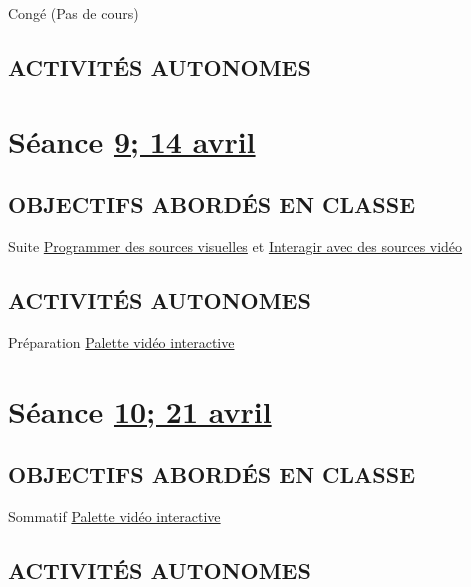 \documentclass[
  french,
]{book}
\begin{document}
Congé (Pas de cours)

\hypertarget{activituxe9s-autonomes-9}{%
\subsection{ACTIVITÉS AUTONOMES}\label{activituxe9s-autonomes-9}}

\hypertarget{semaine_11}{%
\section{\texorpdfstring{Séance \protect\hyperlink{semaine_11}{9; 14 avril}}{Séance 9; 14 avril}}\label{semaine_11}}

\hypertarget{objectifs-aborduxe9s-en-classe-10}{%
\subsection{OBJECTIFS ABORDÉS EN CLASSE}\label{objectifs-aborduxe9s-en-classe-10}}

Suite \protect\hyperlink{programmer}{Programmer des sources visuelles}
et \protect\hyperlink{interagir}{Interagir avec des sources vidéo}

\hypertarget{activituxe9s-autonomes-10}{%
\subsection{ACTIVITÉS AUTONOMES}\label{activituxe9s-autonomes-10}}

Préparation \protect\hyperlink{sommatif_4}{Palette vidéo interactive}

\hypertarget{semaine_12}{%
\section{\texorpdfstring{Séance \protect\hyperlink{semaine_12}{10; 21 avril}}{Séance 10; 21 avril}}\label{semaine_12}}

\hypertarget{objectifs-aborduxe9s-en-classe-11}{%
\subsection{OBJECTIFS ABORDÉS EN CLASSE}\label{objectifs-aborduxe9s-en-classe-11}}

Sommatif \protect\hyperlink{sommatif_4}{Palette vidéo interactive}

\hypertarget{activituxe9s-autonomes-11}{%
\subsection{ACTIVITÉS AUTONOMES}\label{activituxe9s-autonomes-11}}
\end{document}
